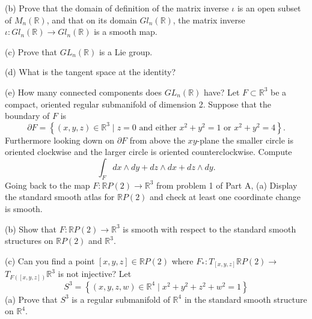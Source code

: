 \documentclass[10pt]{article}
\begin{document}
(b) Prove that the domain of definition of the matrix inverse $\iota$ is an open subset of $M_{n}(\mathbb{R})$, and that on its domain $G l_{n}(\mathbb{R})$, the matrix inverse $\iota: G l_{n}(\mathbb{R}) \rightarrow G l_{n}(\mathbb{R})$ is a smooth map.

(c) Prove that $G L_{n}(\mathbb{R})$ is a Lie group.

(d) What is the tangent space at the identity?

(e) How many connected components does $G L_{n}(\mathbb{R})$ have?
\newpage
Let $F \subset \mathbb{R}^{3}$ be a compact, oriented regular submanifold of dimension 2. Suppose that the boundary of $F$ is
$$
\partial F=\left\{(x, y, z) \in \mathbb{R}^{3} \mid z=0 \text { and either } x^{2}+y^{2}=1 \text { or } x^{2}+y^{2}=4\right\} .
$$
Furthermore looking down on $\partial F$ from above the $x y$-plane the smaller circle is oriented clockwise and the larger circle is oriented counterclockwise. Compute
$$
\int_{F} d x \wedge d y+d z \wedge d x+d z \wedge d y .
$$
\newpage
Going back to the map $F: \mathbb{R} P(2) \rightarrow \mathbb{R}^{3}$ from problem 1 of Part A,
(a) Display the standard smooth atlas for $\mathbb{R} P(2)$ and check at least one coordinate change is smooth.

(b) Show that $F: \mathbb{R} P(2) \rightarrow \mathbb{R}^{3}$ is smooth with respect to the standard smooth structures on $\mathbb{R} P(2)$ and $\mathbb{R}^{3}$.

(c) Can you find a point $[x, y, z] \in \mathbb{R} P(2)$ where $F_{*}: T_{[x, y, z]} \mathbb{R} P(2) \rightarrow$ $T_{F([x, y, z])} \mathbb{R}^{3}$ is not injective?
\newpage
Let
$$
S^{3}=\left\{(x, y, z, w) \in \mathbb{R}^{4} \mid x^{2}+y^{2}+z^{2}+w^{2}=1\right\}
$$
(a) Prove that $S^{3}$ is a regular submanifold of $\mathbb{R}^{4}$ in the standard smooth structure on $\mathbb{R}^{4}$.
\end{document}

